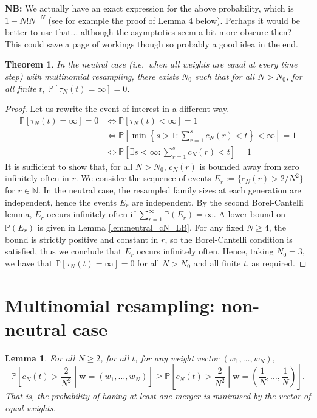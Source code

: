 \documentclass{article}
\newtheorem{thm}{Theorem}
\newtheorem{lemma}{Lemma}
\newcommand{\PR}{\mathbb{P}}
\begin{document}
\textbf{NB:} We actually have an exact expression for the above probability, which is $1- N! N^{-N} $ (see for example the proof of Lemma 4 below). Perhaps it would be better to use that... although the asymptotics seem a bit more obscure then? This could save a page of workings though so probably a good idea in the end. 

\begin{thm}\label{thm:nontrivial_mn_optimalw}
In the neutral case (i.e.\ when all weights are equal at every time step) with multinomial resampling, there exists $N_0$ such that for all $N>N_0$, for all finite $t$, $\PR[\tau_N(t) = \infty] =0$.
\end{thm}

\begin{proof}
Let us rewrite the event of interest in a different way.
\begin{align*}
\PR[\tau_N(t) = \infty] =0 &\Leftrightarrow \PR[\tau_N(t) < \infty] =1 \\
&\Leftrightarrow \PR\left[ \min \left\{s>1 : \sum_{r=1}^s c_N(r) <t \right\} < \infty \right] =1 \\
&\Leftrightarrow \PR\left[ \exists s<\infty : \sum_{r=1}^s c_N(r) <t \right] =1
\end{align*}
It is sufficient to show that, for all $N>N_0$, $c_N(r)$ is bounded away from zero infinitely often in $r$.
We consider the sequence of events 
$E_r := \{ c_N(r) > 2/N^2 \}$ for $r \in \mathbb{N}$.
In the neutral case, the resampled family sizes at each generation are independent, hence the events $E_r$ are independent. 
By the second Borel-Cantelli lemma, $E_r$ occurs infinitely often if $\sum_{r=1}^\infty \PR(E_r) = \infty$. 
A lower bound on $\PR(E_r)$ is given in Lemma \ref{lem:neutral_cN_LB}. 
For any fixed $N\geq 4$, the bound is strictly positive and constant in $r$, so the Borel-Cantelli condition is satisfied, thus we conclude that $E_r$ occurs infinitely often.
Hence, taking $N_0=3$, we have that $\PR[\tau_N(t) = \infty] =0$ for all $N>N_0$ and all finite $t$, as required.
\end{proof}

\section*{Multinomial resampling: non-neutral case}

\begin{lemma}\label{lem:mn_optimal_w}
For all $N\geq 2$, for all $t$, for any weight vector $(w_1, \dots, w_N)$,
\begin{equation*}
\PR \left[c_N(t) > \frac{2}{N^2} \middle| \mathbf{w}=(w_1, \dots, w_N) \right]
\geq \PR \left[c_N(t) > \frac{2}{N^2} \middle| \mathbf{w}=\left( \frac{1}{N}, \dots, \frac{1}{N} \right) \right] .
\end{equation*}
That is, the probability of having at least one merger is minimised by the vector of equal weights.
\end{lemma}
\end{document}
